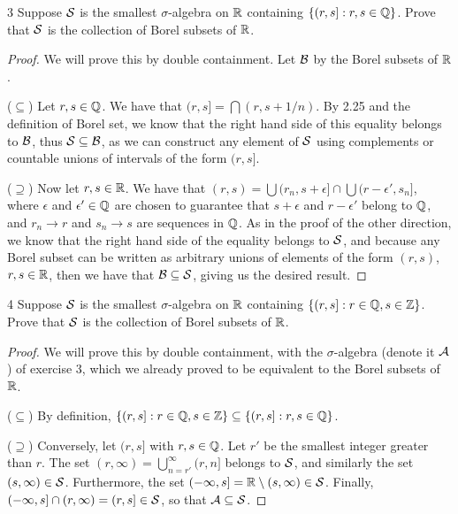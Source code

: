 \begin{exercise}{3}
Suppose $\mathcal{S}$ is the smallest $\sigma$-algebra on $\mathbb{R}$ containing $\{(r,s]:r,s\in\mathbb{Q}\}$.
Prove that $\mathcal{S}$ is the collection of Borel subsets of $\mathbb{R}$.
\end{exercise}
\begin{proof}
We will prove this by double containment.
Let $\mathcal{B}$ by the Borel subsets of $\mathbb{R}$.

($\subseteq$)
Let $r,s\in\mathbb{Q}$.
We have that $(r,s] = \bigcap (r, s+1/n)$.
By 2.25 and the definition of Borel set, we know that the right hand side of this equality belongs to $\mathcal{B}$, thus $\mathcal{S} \subseteq \mathcal{B}$, as we can construct any element of $\mathcal{S}$ using complements or countable unions of intervals of the form $(r,s]$.

($\supseteq$)
Now let $r,s\in\mathbb{R}$.
We have that $(r,s) = \bigcup (r_n, s+\epsilon] \cap \bigcup (r-\epsilon', s_n]$, where $\epsilon$ and $\epsilon' \in \mathbb{Q}$ are chosen to guarantee that $s+\epsilon$ and $r-\epsilon'$ belong to $\mathbb{Q}$, and $r_n \to r$ and $s_n \to s$ are sequences in $\mathbb{Q}$.
As in the proof of the other direction, we know that the right hand side of the equality belongs to $\mathcal{S}$, and because any Borel subset can be written as arbitrary unions of elements of the form $(r,s)$, $r,s\in\mathbb{R}$, then we have that $\mathcal{B} \subseteq \mathcal{S}$, giving us the desired result.
\end{proof} 

\begin{exercise}{4}
Suppose $\mathcal{S}$ is the smallest $\sigma$-algebra on $\mathbb{R}$ containing $\{(r,s]:r\in\mathbb{Q}, s\in\mathbb{Z}\}$.
Prove that $\mathcal{S}$ is the collection of Borel subsets of $\mathbb{R}$.
\end{exercise}
\begin{proof}
We will prove this by double containment, with the $\sigma$-algebra (denote it $\mathcal{A}$) of exercise 3, which we already proved to be equivalent to the Borel subsets of $\mathbb{R}$.

($\subseteq$)
By definition, $\{(r,s]:r\in\mathbb{Q}, s\in\mathbb{Z}\} \subseteq \{(r,s]:r,s\in\mathbb{Q}\}$.

($\supseteq$)
Conversely, let $(r,s]$ with $r,s \in \mathbb{Q}$.
Let $r'$ be the smallest integer greater than $r$.
The set $(r,\infty) = \bigcup_{n=r'}^\infty (r,n]$ belongs to $\mathcal{S}$, and similarly the set $(s,\infty) \in \mathcal{S}$.
Furthermore, the set $(-\infty, s] = \mathbb{R} \setminus (s,\infty) \in \mathcal{S}$.
Finally, $(-\infty,s] \cap (r,\infty) = (r,s] \in \mathcal{S}$, so that $\mathcal{A} \subseteq \mathcal{S}$.
\end{proof} 


